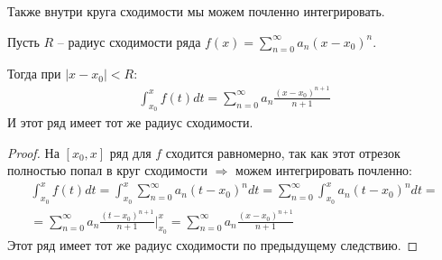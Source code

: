 \vspace*{5mm}

Также внутри круга сходимости мы можем почленно интегрировать.

\begin{theorem}
    Пусть $R$ -- радиус сходимости ряда $f(x) = \sum\limits_{n = 0}^\infty a_n(x - x_0)^n$.
    
    Тогда при $|x - x_0| < R:$
    \begin{gather*}
        \int_{x_0}^x f(t)dt = \sum\limits_{n = 0}^\infty a_n \frac{(x - x_0)^{n+1}}{n+1}
    \end{gather*}
    И этот ряд имеет тот же радиус сходимости.
\end{theorem}
\begin{proof}
    На $[x_0, x]$ ряд для $f$ сходится равномерно, так как этот отрезок полностью попал в круг сходимости $\Rightarrow$ можем интегрировать почленно:
    \begin{gather*}
        \int_{x_0}^x f(t)dt = \int_{x_0}^x \sum_{n=0}^\infty a_n(t - x_0)^n dt = \sum_{n=0}^\infty \int_{x_0}^x a_n(t - x_0)^n dt =  \\
        = \sum_{n = 0}^\infty a_n \frac{(t - x_0)^{n+1}}{n+1}\Big|_{x_0}^x = \sum_{n=0}^\infty a_n \frac{(x - x_0)^{n+1}}{n+1} 
    \end{gather*}
    Этот ряд имеет тот же радиус сходимости по предыдущему следствию.
\end{proof}